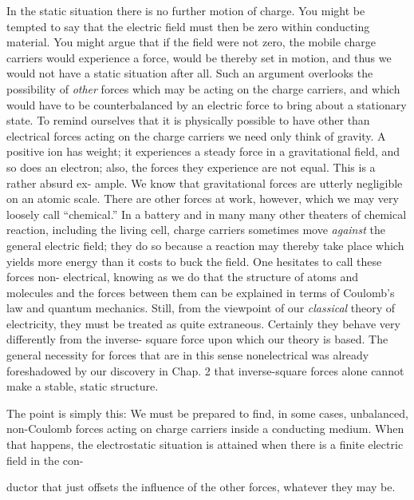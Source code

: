 In the static situation there is no further motion of charge. You
might be tempted to say that the electric field must then be zero
within conducting material. You might argue that if the field were
not zero, the mobile charge carriers would experience a force, would
be thereby set in motion, and thus we would not have a static situation
after all. Such an argument overlooks the possibility of \emph{other}
forces which may be acting on the charge carriers, and which would
have to be counterbalanced by an electric force to bring about a
stationary state. To remind ourselves that it is physically possible
to have other than electrical forces acting on the charge carriers we
need only think of gravity. A positive ion has weight; it experiences
a steady force in a gravitational field, and so does an electron; also,
the forces they experience are not equal. This is a rather absurd ex-
ample. We know that gravitational forces are utterly negligible on
an atomic scale. There are other forces at work, however, which we
may very loosely call ``chemical.'' In a battery and in many many
other theaters of chemical reaction, including the living cell, charge
carriers sometimes move \emph{against} the general electric field; they do so
because a reaction may thereby take place which yields more energy
than it costs to buck the field. One hesitates to call these forces non-
electrical, knowing as we do that the structure of atoms and molecules
and the forces between them can be explained in terms of
Coulomb's law and quantum mechanics. Still, from the viewpoint of
our \emph{classical} theory of electricity, they must be treated as quite 
extraneous. Certainly they behave very differently from the inverse-
square force upon which our theory is based. The general necessity
for forces that are in this sense nonelectrical was already foreshadowed
by our discovery in Chap. 2 that inverse-square forces alone
cannot make a stable, static structure.

The point is simply this: We must be prepared to find, in some
cases, unbalanced, non-Coulomb forces acting on charge carriers
inside a conducting medium. When that happens, the electrostatic
situation is attained when there is a finite electric field in the con-

ductor that just offsets the influence of the other forces, whatever
they may be.

